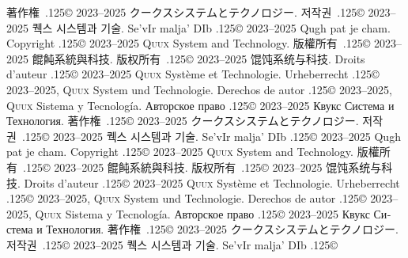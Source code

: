 \documentclass{cookbook}
\begin{document}
{{著作権~{\lower.125\baselineskip\hbox{\copyright}}
	2023--2025 クークスシステムとテクノロジー.
저작권~{\lower.125\baselineskip\hbox{\copyright}}
	2023--2025 퀙스 시스템과 기술.
Se'vIr malja' DIb {\lower.125\baselineskip\hbox{\copyright}} %
	2023--2025 Qugh pat je cham.
Copyright {\lower.125\baselineskip\hbox{\copyright}}
	2023--2025 \textsc{Quux} System and Technology.
版權所有~{\lower.125\baselineskip\hbox{\copyright}}
	2023--2025 餛飩系統與科技.
版权所有~{\lower.125\baselineskip\hbox{\copyright}}
	2023--2025 馄饨系统与科技.
Droits d'auteur {\lower.125\baselineskip\hbox{\copyright}} %
	2023--2025 \textsc{Quux} Système et Technologie.
Urheberrecht {\lower.125\baselineskip\hbox{\copyright}} %
	2023--2025, \textsc{Quux} System und Technologie.
Derechos de autor {\lower.125\baselineskip\hbox{\copyright}} %
	2023--2025, \textsc{Quux} Sistema y Tecnología.
\foreignlanguage{russian}{Авторское право} %
	{\lower.125\baselineskip\hbox{\copyright}}
	2023–2025 \foreignlanguage{russian}{Квукс Система и Технология.}
著作権~{\lower.125\baselineskip\hbox{\copyright}}
	2023--2025 クークスシステムとテクノロジー.
저작권~{\lower.125\baselineskip\hbox{\copyright}}
	2023--2025 퀙스 시스템과 기술.
Se'vIr malja' DIb {\lower.125\baselineskip\hbox{\copyright}} %
	2023--2025 Qugh pat je cham.
Copyright {\lower.125\baselineskip\hbox{\copyright}}
	2023--2025 \textsc{Quux} System and Technology.
版權所有~{\lower.125\baselineskip\hbox{\copyright}}
	2023--2025 餛飩系統與科技.
版权所有~{\lower.125\baselineskip\hbox{\copyright}}
	2023--2025 馄饨系统与科技.
Droits d'auteur {\lower.125\baselineskip\hbox{\copyright}} %
	2023--2025 \textsc{Quux} Système et Technologie.
Urheberrecht {\lower.125\baselineskip\hbox{\copyright}} %
	2023--2025, \textsc{Quux} System und Technologie.
Derechos de autor {\lower.125\baselineskip\hbox{\copyright}} %
	2023--2025, \textsc{Quux} Sistema y Tecnología.
\foreignlanguage{russian}{Авторское право} %
	{\lower.125\baselineskip\hbox{\copyright}}
	2023–2025 \foreignlanguage{russian}{Квукс Система и Технология.}
著作権~{\lower.125\baselineskip\hbox{\copyright}}
	2023--2025 クークスシステムとテクノロジー.
저작권~{\lower.125\baselineskip\hbox{\copyright}}
	2023--2025 퀙스 시스템과 기술.
Se'vIr malja' DIb {\lower.125\baselineskip\hbox{\copyright}} %
}}
\end{document}
